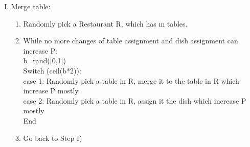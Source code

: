 \documentclass{article}
\begin{document}
\begin{spacing}{1.1}
\begin{enumerate}[(I)]
\begin{enumerate}[(1)]
\begin{enumerate}[(a)]
For ww=randperm(customers from table t except C1,C2) \\ 
$z_{t2}^{'}$: change $z_{t2}$ by assigning customer ww to the table (m+1), which increase the P by tmp1\\
$z_{t2}^{''}$: change $z_{t2}$ by assigning customer ww to the table (m+2), which increase the P by tmp2 \\
assign customer ww to table (m+argmax\{tmp1,tmp2\})\\
End \\ \\
\item Iteration(2-means):\\ \\
While no more changes of table assignment and dish assignment can increase P:\\
b=rand([0,1]) \\
Switch (ceil(b*4)):\\
case 1: Randomly pick a customer from table (m+1), assign it to table (m+2) if the change increase P\\
case 2: Randomly pick a customer from table (m+2), assign it to table (m+1) if the change increase P\\
case 3: pick table (m+1), assign it the dish which increase P mostly\\
case 4: pick table (m+2), assign it the dish which increase P mostly\\
End\\
\end{enumerate}  
\item Go back to Step I)
\end{enumerate}  









\item Merge table:\\
\begin{enumerate}[(1)]
\item Randomly pick a Restaurant R, which has m tables.
\item 
 While no more changes of table assignment and dish assignment can increase P:\\
 b=rand([0,1]) \\
 Switch (ceil(b*2)):\\
 case 1: Randomly pick a table in R, merge it to the table in R which increase P mostly\\
 case 2: Randomly pick a table in R, assign it the dish which increase P mostly\\
 End\\
\item Go back to Step I)
\end{enumerate}  



\end{enumerate}
\end{spacing}
\end{document}
